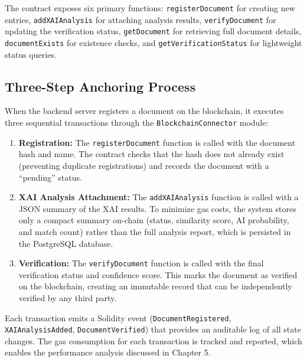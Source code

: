         The contract exposes six primary functions: \texttt{registerDocument} for creating new entries, \texttt{addXAIAnalysis} for attaching analysis results, \texttt{verifyDocument} for updating the verification status, \texttt{getDocument} for retrieving full document details, \texttt{documentExists} for existence checks, and \texttt{getVerificationStatus} for lightweight status queries.
        
        \subsection{Three-Step Anchoring Process}
        \label{sec:three_step_anchoring}
        
        When the backend server registers a document on the blockchain, it executes three sequential transactions through the \texttt{BlockchainConnector} module:
        
        \begin{enumerate}
            \item \textbf{Registration:} The \texttt{registerDocument} function is called with the document hash and name. The contract checks that the hash does not already exist (preventing duplicate registrations) and records the document with a ``pending'' status.
        
            \item \textbf{XAI Analysis Attachment:} The \texttt{addXAIAnalysis} function is called with a JSON summary of the XAI results. To minimize gas costs, the system stores only a compact summary on-chain (status, similarity score, AI probability, and match count) rather than the full analysis report, which is persisted in the PostgreSQL database.
        
            \item \textbf{Verification:} The \texttt{verifyDocument} function is called with the final verification status and confidence score. This marks the document as verified on the blockchain, creating an immutable record that can be independently verified by any third party.
        \end{enumerate}
        
        Each transaction emits a Solidity event (\texttt{DocumentRegistered}, \texttt{XAIAnalysisAdded}, \texttt{DocumentVerified}) that provides an auditable log of all state changes. The gas consumption for each transaction is tracked and reported, which enables the performance analysis discussed in Chapter 5.

